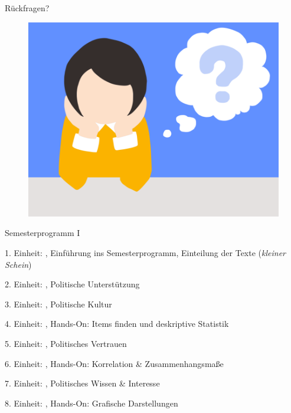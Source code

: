 \documentclass[11pt]{beamer}
\begin{document}
\begin{frame}[t]{Rückfragen?}
	\begin{center}
		\begin{figure}[ht]
			\includegraphics[width=\textwidth]{pics/pre8.png}
		\end{figure}	
	\end{center}
\end{frame}

\begin{frame}[t]{Semesterprogramm I}
\begin{nolist}
		\item[1.] Einheit: , Einführung ins Semesterprogramm, Einteilung der Texte (\textit{kleiner Schein})
		\item[2.] Einheit: , Politische Unterstützung \pause
		\item[3.] Einheit: , Politische Kultur
		\item[4.] Einheit: , Hands-On: Items finden und deskriptive Statistik \pause
		\item[5.] Einheit: , Politisches Vertrauen
		\item[6.] Einheit: , Hands-On: Korrelation \& Zusammenhangsmaße \pause
		\item[7.] Einheit: , Politisches Wissen \& Interesse
		\item[8.] Einheit: , Hands-On: Grafische Darstellungen \pause
\end{nolist}
\end{frame}
\end{document}
